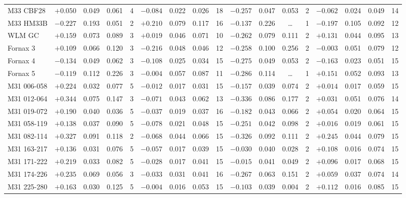 \documentclass{aa}
\begin{document}
\begin{appendix}
\begin{table*}
\begin{adjustbox}{width=1\textwidth}
{\begin{tabular}{l cccccccccccccccc}
M33 CBF28     & $+0.050$ & 0.049 & 0.061 & 4 & $-0.084$ & 0.022 & 0.026 & 18 & $-0.257$ & 0.047 & 0.053 & 2 & $-0.062$ & 0.024 & 0.049 & 14 \\
M33 HM33B     & $-0.227$ & 0.193 & 0.051 & 2 & $+0.210$ & 0.079 & 0.117 & 16 & $-0.137$ & 0.226 & \ldots & 1 & $-0.197$ & 0.105 & 0.092 & 12 \\
WLM GC        & $+0.159$ & 0.073 & 0.089 & 3 & $+0.019$ & 0.046 & 0.071 & 10 & $-0.262$ & 0.079 & 0.111 & 2 & $+0.131$ & 0.044 & 0.095 & 13 \\
Fornax 3      & $+0.109$ & 0.066 & 0.120 & 3 & $-0.216$ & 0.048 & 0.046 & 12 & $-0.258$ & 0.100 & 0.256 & 2 & $-0.003$ & 0.051 & 0.079 & 12 \\
Fornax 4      & $-0.134$ & 0.049 & 0.062 & 3 & $-0.108$ & 0.025 & 0.034 & 15 & $-0.275$ & 0.049 & 0.053 & 2 & $-0.163$ & 0.023 & 0.051 & 15 \\
Fornax 5      & $-0.119$ & 0.112 & 0.226 & 3 & $-0.004$ & 0.057 & 0.087 & 11 & $-0.286$ & 0.114 & \ldots & 1 & $+0.151$ & 0.052 & 0.093 & 13 \\
M31 006-058   & $+0.224$ & 0.032 & 0.077 & 5 & $-0.012$ & 0.017 & 0.031 & 15 & $-0.157$ & 0.039 & 0.074 & 2 & $+0.014$ & 0.017 & 0.059 & 15 \\
M31 012-064   & $+0.344$ & 0.075 & 0.147 & 3 & $-0.071$ & 0.043 & 0.062 & 13 & $-0.336$ & 0.086 & 0.177 & 2 & $+0.031$ & 0.051 & 0.076 & 14 \\
M31 019-072   & $+0.190$ & 0.040 & 0.036 & 5 & $-0.037$ & 0.019 & 0.037 & 16 & $-0.182$ & 0.043 & 0.066 & 2 & $+0.054$ & 0.020 & 0.064 & 15 \\
M31 058-119   & $+0.138$ & 0.037 & 0.090 & 5 & $-0.078$ & 0.021 & 0.048 & 15 & $-0.251$ & 0.042 & 0.098 & 2 & $+0.016$ & 0.019 & 0.061 & 15 \\
M31 082-114   & $+0.327$ & 0.091 & 0.118 & 2 & $-0.068$ & 0.044 & 0.066 & 15 & $-0.326$ & 0.092 & 0.111 & 2 & $+0.245$ & 0.044 & 0.079 & 15 \\
M31 163-217   & $+0.136$ & 0.031 & 0.076 & 5 & $-0.057$ & 0.017 & 0.039 & 15 & $-0.030$ & 0.040 & 0.028 & 2 & $+0.108$ & 0.016 & 0.074 & 15 \\
M31 171-222   & $+0.219$ & 0.033 & 0.082 & 5 & $-0.028$ & 0.017 & 0.041 & 15 & $-0.015$ & 0.041 & 0.049 & 2 & $+0.096$ & 0.017 & 0.068 & 15 \\
M31 174-226   & $+0.235$ & 0.069 & 0.056 & 3 & $-0.033$ & 0.031 & 0.041 & 16 & $-0.267$ & 0.063 & 0.151 & 2 & $+0.059$ & 0.037 & 0.074 & 14 \\
M31 225-280   & $+0.163$ & 0.030 & 0.125 & 5 & $-0.004$ & 0.016 & 0.053 & 15 & $-0.103$ & 0.039 & 0.004 & 2 & $+0.112$ & 0.016 & 0.085 & 15 \\

\end{tabular}}
\end{adjustbox}
\end{table*}
\end{appendix}
\end{document}
